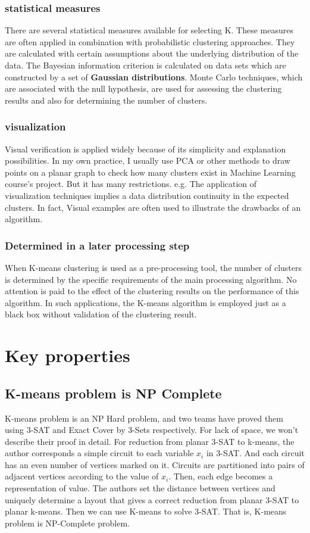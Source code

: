\documentclass[11pt]{article}
\begin{document}
\subsubsection{statistical measures}
There are several statistical measures available for selecting K. These measures are often applied in combination with probabilistic clustering approaches.
They are calculated with certain assumptions about the underlying distribution of the data. The Bayesian information criterion is calculated on data sets which are constructed by a set of \textbf{Gaussian distributions}. Monte Carlo techniques, which are associated with the null hypothesis, are used for assessing the clustering results and also for determining the number of clusters.

\subsubsection{visualization}
Visual verification is applied widely because of its simplicity and explanation possibilities. In my own practice, I usually use PCA or other methods to draw points on a planar graph to check how many clusters exist in Machine Learning course's project. But it has many restrictions. e.g. The application of
visualization techniques implies a data distribution continuity in the expected clusters. In fact, Visual examples are often used to illustrate the drawbacks of an algorithm. \par

\subsubsection{Determined in a later processing step}
When K-means clustering is used as a pre-processing tool, the number of clusters is determined by the specific requirements of the main processing algorithm. No attention is paid to the effect of the clustering results on the performance of this algorithm. In such applications, the K-means algorithm is employed just as a black box without validation of the clustering result. \par

\section{Key properties}
\subsection{K-means problem is NP Complete}
K-means problem is an NP Hard problem, and two teams have proved them using 3-SAT and Exact Cover by 3-Sets respectively.\cite{npc-prove,Vattani_thehardness}  For lack of space, we won't describe their proof in detail. For reduction from planar 3-SAT to k-means, the author corresponds a simple circuit to each variable $x_i$ in 3-SAT. And each circuit has an even number of vertices marked on it. Circuits are partitioned into pairs of adjacent vertices according to the value of $x_i$. Then, each edge becomes a representation of value. The authors set the distance between vertices and uniquely determine a layout that gives a correct reduction from planar 3-SAT to planar k-means. Then we can use K-means to solve 3-SAT. That is, K-means problem is NP-Complete problem.
\end{document}
